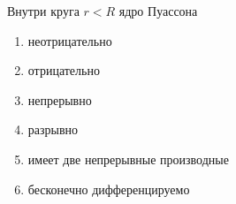 Внутри круга \(r < R\) ядро Пуассона

\begin{enumerate}[label=\arabic*)]
    \item неотрицательно
    \item отрицательно
    \item непрерывно
    \item разрывно
    \item имеет две непрерывные производные
    \item бесконечно дифференцируемо
\end{enumerate}

